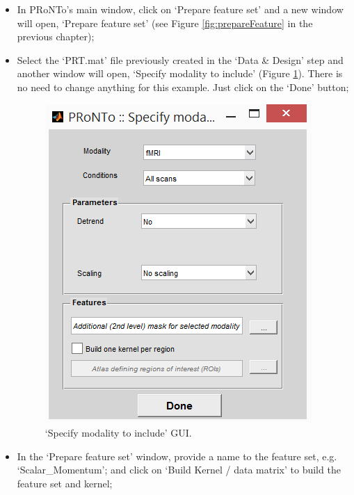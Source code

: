 \begin{itemize}

	\item In PRoNTo's main window, click on `Prepare feature set' and a new window will open, `Prepare feature set' (see Figure \ref{fig:prepareFeature} in the previous chapter);   

	\item Select the `PRT.mat' file previously created in the `Data \& Design' step and another window will open, `Specify modality to include' (Figure \ref{fig:specifyModality2}). There is no need to change anything for this example. Just click on the `Done' button;
	
	\begin{figure}[h!]
            \begin{center}
                \includegraphics[scale=0.75]{images/Tutorial/regression/specifyModality2.png}
            \end{center}
            \caption{`Specify modality to include' GUI.}
            \label{fig:specifyModality2}
        \end{figure}
	
	\item In the `Prepare feature set' window, provide a name to the feature set, e.g. `Scalar\_Momentum'; and click on `Build Kernel / data matrix' to build the feature set and kernel;
	
\end{itemize}

